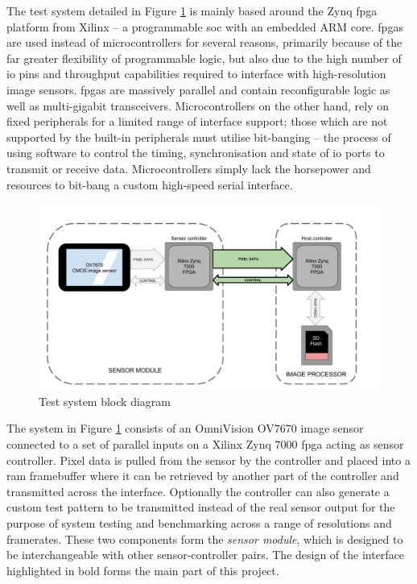 The test system detailed in Figure \ref{fig:block_diagram_overview} is mainly based around the Zynq \gls{fpga} platform from Xilinx -- a programmable \gls{soc} with an embedded ARM core. \Glspl{fpga} are used instead of microcontrollers for several reasons, primarily because of the far greater flexibility of programmable logic, but also due to the high number of \gls{io} pins and throughput capabilities required to interface with high-resolution image sensors. \Glspl{fpga} are massively parallel and contain reconfigurable logic as well as multi-gigabit transceivers. Microcontrollers on the other hand, rely on fixed peripherals for a limited range of interface support; those which are not supported by the built-in peripherals must utilise bit-banging -- the process of using software to control the timing, synchronisation and state of \gls{io} ports to transmit or receive data. Microcontrollers simply lack the horsepower and resources to bit-bang a custom high-speed serial interface.

\begin{figure}
  \centering
  \includegraphics[width=1\textwidth]{./img/block_diagram_overview.png}
  \caption{Test system block diagram}
  \label{fig:block_diagram_overview}
\end{figure}

The system in Figure \ref{fig:block_diagram_overview} consists of an OmniVision OV7670 image sensor connected to a set of parallel inputs on a Xilinx Zynq 7000 \gls{fpga} acting as sensor controller. Pixel data is pulled from the sensor by the controller and placed into a \gls{ram} framebuffer where it can be retrieved by another part of the controller and transmitted across the interface. Optionally the controller can also generate a custom test pattern to be transmitted instead of the real sensor output for the purpose of system testing and benchmarking across a range of resolutions and framerates. These two components form the \textit{sensor module}, which is designed to be interchangeable with other sensor-controller pairs. The design of the interface highlighted in bold forms the main part of this project. 

